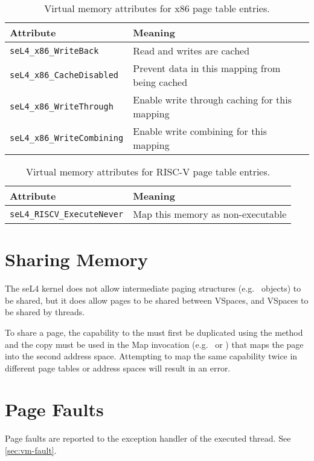 \begin{table}[htb]
  \begin{center}
    \begin{tabularx}{\textwidth}{p{}X}
      \toprule
      Attribute & Meaning \\
      \midrule
      \texttt{seL4\_x86\_WriteBack} & Read and writes are cached \\
      \texttt{seL4\_x86\_CacheDisabled} & Prevent data in this mapping
      from being cached \\
      \texttt{seL4\_x86\_WriteThrough} & Enable write through caching for this mapping \\
      \texttt{seL4\_x86\_WriteCombining} & Enable write combining for this mapping \\
      \bottomrule
    \end{tabularx}
    \caption{\label{tbl:vmattr_x86} Virtual memory attributes for x86 page
      table entries.}
  \end{center}
\end{table}

\begin{table}[htb]
  \begin{center}
    \begin{tabularx}{\textwidth}{p{}X}
      \toprule
      Attribute & Meaning \\
      \midrule
      \texttt{seL4\_RISCV\_ExecuteNever} & Map this memory as non-executable \\
      \bottomrule
    \end{tabularx}
    \caption{\label{tbl:vmattr_riscv} Virtual memory attributes for RISC-V page
      table entries.}
  \end{center}
\end{table}

\section{Sharing Memory}

The seL4 kernel does not allow intermediate paging structures (e.g.\  objects) to be
shared, but it does allow pages to be shared between VSpaces, and VSpaces to be shared by threads.

To share a page, the capability to the  must first be duplicated using the
 method and the copy must be used in the Map invocation
(e.g.\  \ifxeightsix or
\fi) that maps the page into the second address space.
Attempting to map the same capability twice in different page tables or address spaces will result
in an error.


\section{Page Faults}

Page faults are reported to the exception handler of the executed thread.
See \autoref{sec:vm-fault}.
